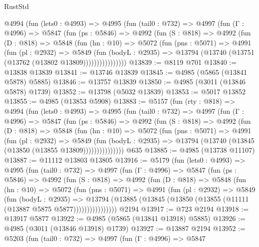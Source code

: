 \begin{lexlean}{RustStd}
\begin{coremodule}
      @4994
        (fun (lets0 : @4993) =>
        @4995
          (fun (tail0 : @732) =>
          @4997
            (fun (Γ : @4996) =>
            @5847
              (fun (ps : @5846) =>
              @4992
                (fun (S : @818) =>
                @4992
                  (fun (D : @818) =>
                  @5848
                    (fun (hn : @10) =>
                    @5072
                      (fun (pns : @5071) =>
                      @4991
                        (fun (pl : @2932) =>
                        @5849
                          (fun (bodyL : @2935) =>
                          @13794 (@13740 (@13751 (@13762 (@13802 @13809))))))))))))))))
@13839 := @8119 @701
@13840 := @13838 @13839
@13841 := @13746 @13839
@13845 := @4985 (@5865 (@13841 @5878) @5885)
@13846 := @13757 @13839
@13850 := @4985 (@3011 (@13846 @5878) @1739)
@13852 := @13798 (@5032 @13839)
@13853 := @5017 @13852
@13855 := @4985 (@13853 @5908)
@13883 := @5157
    (fun (rty : @818) =>
    @4994
      (fun (lets0 : @4993) =>
      @4995
        (fun (tail0 : @732) =>
        @4997
          (fun (Γ : @4996) =>
          @5847
            (fun (ps : @5846) =>
            @4992
              (fun (S : @818) =>
              @4992
                (fun (D : @818) =>
                @5848
                  (fun (hn : @10) =>
                  @5072
                    (fun (pns : @5071) =>
                    @4991
                      (fun (pl : @2932) =>
                      @5849
                        (fun (bodyL : @2935) =>
                        @13794 (@13740 (@13845 (@13850 (@13855 @13809)))))))))))))))
    @635
@13885 := @4985 (@13738 @11107)
@13887 := @11112 @13803 @13805
@13916 := @5179
    (fun (lets0 : @4993) =>
    @4995
      (fun (tail0 : @732) =>
      @4997
        (fun (Γ : @4996) =>
        @5847
          (fun (ps : @5846) =>
          @4992
            (fun (S : @818) =>
            @4992
              (fun (D : @818) =>
              @5848
                (fun (hn : @10) =>
                @5072
                  (fun (pns : @5071) =>
                  @4991
                    (fun (pl : @2932) =>
                    @5849
                      (fun (bodyL : @2935) =>
                      @13794
                        (@13885 (@13845 (@13850 (@13855 (@11111 (@13887 @5875 @5877))))))))))))))))
    @2194
@13917 := @723 @2194
@13918 := @13917 @5877
@13922 := @4985 (@5865 (@13841 @13918) @5885)
@13926 := @4985 (@3011 (@13846 @13918) @1739)
@13927 := @13887 @2194
@13952 := @5203
    (fun (tail0 : @732) =>
    @4997
      (fun (Γ : @4996) =>
      @5847

\end{coremodule}
\end{lexlean}
